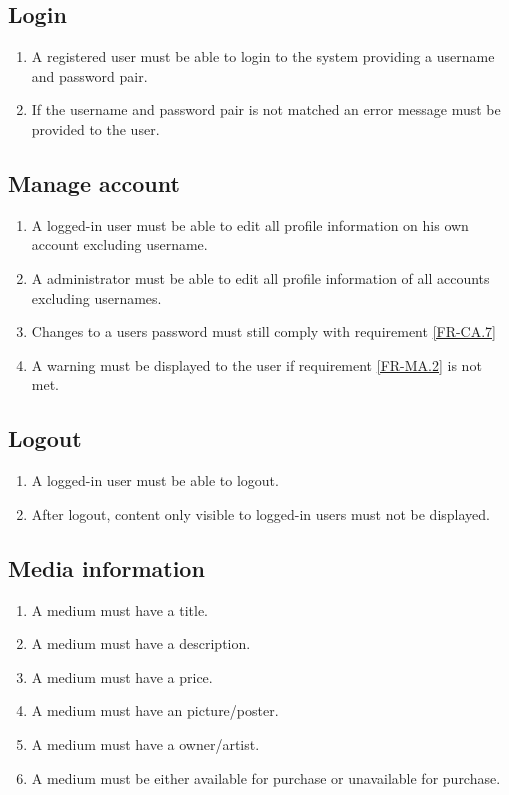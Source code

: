 \subsection {Login}
	
\begin{enumerate}[label=FR-\twodigits*, resume]
	\item A registered user must be able to login to the system providing a username and password pair.
	\item If the username and password pair is not matched an error message must be provided to the user. 
\end{enumerate}
		
\subsection {Manage account}

\begin{enumerate}[label=FR-\twodigits*, resume]
	\item A logged-in user must be able to edit all profile information on his own account excluding username.
	\item A administrator must be able to edit all profile information of all accounts excluding usernames.
	\item Changes to a users password must still comply with requirement \ref{FR-CA.7} \label{FR-MA.2}
	\item A warning must be displayed to the user if requirement \ref{FR-MA.2} is not met.	
\end{enumerate}
		
\subsection {Logout}
\begin{enumerate}[label=FR-\twodigits*, resume]
	\item A logged-in user must be able to logout.
	\item After logout, content only visible to logged-in users must not be displayed.
\end{enumerate}
	
\subsection {Media information} \label{FR-Media}

\begin{enumerate}[label=FR-\twodigits*, resume]
	\item A medium must have a title.
	\item A medium must have a description.
	\item A medium must have a price.
	\item A medium must have an picture/poster.
	\item A medium must have a owner/artist.
	\item A medium must be either available for purchase or unavailable for purchase.
\end{enumerate}

